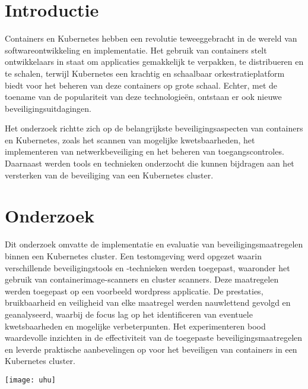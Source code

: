 \documentclass[a0,portrait]{hogent-poster}
\begin{document}
\begin{multicols}{2} %

\section{Introductie}

Containers en Kubernetes hebben een revolutie teweeggebracht in de wereld van softwareontwikkeling en implementatie. Het gebruik van containers stelt ontwikkelaars in staat om applicaties gemakkelijk te verpakken, te distribueren en te schalen, terwijl Kubernetes een krachtig en schaalbaar orkestratieplatform biedt voor het beheren van deze containers op grote schaal. Echter, met de toename van de populariteit van deze technologieën, ontstaan er ook nieuwe beveiligingsuitdagingen.

Het onderzoek richtte zich op de belangrijkste beveiligingsaspecten van containers en Kubernetes, zoals het scannen van mogelijke kwetsbaarheden, het implementeren van netwerkbeveiliging en het beheren van toegangscontroles. Daarnaast werden tools en technieken onderzocht die kunnen bijdragen aan het versterken van de beveiliging van een Kubernetes cluster.

\section{Onderzoek}

Dit onderzoek omvatte de implementatie en evaluatie van beveiligingsmaatregelen binnen een Kubernetes cluster. Een testomgeving werd opgezet waarin verschillende beveiligingstools en -technieken werden toegepast, waaronder het gebruik van containerimage-scanners en cluster scanners. Deze maatregelen werden toegepast op een voorbeeld wordpress applicatie. De prestaties, bruikbaarheid en veiligheid van elke maatregel werden nauwlettend gevolgd en geanalyseerd, waarbij de focus lag op het identificeren van eventuele kwetsbaarheden en mogelijke verbeterpunten. Het experimenteren bood waardevolle inzichten in de effectiviteit van de toegepaste beveiligingsmaatregelen en leverde praktische aanbevelingen op voor het beveiligen van containers in een Kubernetes cluster.

\begin{center}
  \captionsetup{type=figure}
  \texttt{[image: uhu]}
\end{center}


\end{multicols}
\end{document}
